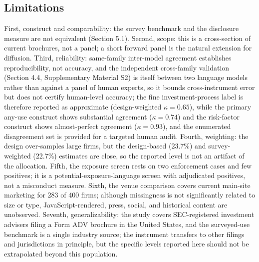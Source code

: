 \documentclass[utf8]{FrontiersinHarvard}
\begin{document}
\subsection{Limitations}
First, construct and comparability: the survey benchmark and the disclosure measure are not equivalent (Section 5.1). Second, scope: this is a cross-section of current brochures, not a panel; a short forward panel is the natural extension for diffusion. Third, reliability: same-family inter-model agreement establishes reproducibility, not accuracy, and the independent cross-family validation (Section 4.4, Supplementary Material S2) is itself between two language models rather than against a panel of human experts, so it bounds cross-instrument error but does not certify human-level accuracy; the fine investment-process label is therefore reported as approximate (design-weighted $\kappa = 0.65$), while the primary any-use construct shows substantial agreement ($\kappa = 0.74$) and the risk-factor construct shows almost-perfect agreement ($\kappa = 0.93$), and the enumerated disagreement set is provided for a targeted human audit. Fourth, weighting: the design over-samples large firms, but the design-based (23.7\%) and survey-weighted (22.7\%) estimates are close, so the reported level is not an artifact of the allocation. Fifth, the exposure screen rests on two enforcement cases and few positives; it is a potential-exposure-language screen with adjudicated positives, not a misconduct measure. Sixth, the venue comparison covers current main-site marketing for 283 of 400 firms; although missingness is not significantly related to size or type, JavaScript-rendered, press, social, and historical content are unobserved. Seventh, generalizability: the study covers SEC-registered investment advisers filing a Form ADV brochure in the United States, and the surveyed-use benchmark is a single industry source; the instrument transfers to other filings and jurisdictions in principle, but the specific levels reported here should not be extrapolated beyond this population.
\end{document}
